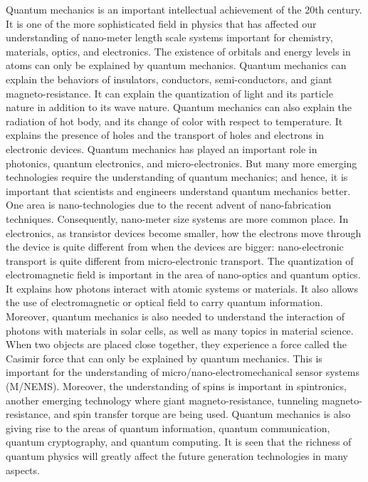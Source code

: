 \documentclass[
  9pt,
]{extbook}
\begin{document}
Quantum mechanics is an important intellectual achievement of the 20th century. It is one of the more sophisticated field in physics that has affected our understanding of nano-meter length scale systems important for chemistry, materials, optics, and electronics. The existence of orbitals and energy levels in atoms can only be explained by quantum mechanics. Quantum mechanics can explain the behaviors of insulators, conductors, semi-conductors, and giant magneto-resistance. It can explain the quantization of light and its particle nature in addition to its wave nature. Quantum mechanics can also explain the radiation of hot body, and its change of color with respect to temperature. It explains the presence of holes and the transport of holes and electrons in electronic devices.
Quantum mechanics has played an important role in photonics, quantum electronics, and micro-electronics. But many more emerging technologies require the understanding of quantum mechanics; and hence, it is important that scientists and engineers understand quantum mechanics better. One area is nano-technologies due to the recent advent of nano-fabrication techniques. Consequently, nano-meter size systems are more common place. In electronics, as transistor devices become smaller, how the electrons move through the device is quite different from when the devices are bigger: nano-electronic transport is quite different from micro-electronic transport.
The quantization of electromagnetic field is important in the area of nano-optics and quantum optics. It explains how photons interact with atomic systems or materials. It also allows the use of electromagnetic or optical field to carry quantum information. Moreover, quantum mechanics is also needed to understand the interaction of photons with materials in solar cells, as well as many topics in material science.
When two objects are placed close together, they experience a force called the Casimir force that can only be explained by quantum mechanics. This is important for the understanding of micro/nano-electromechanical sensor systems (M/NEMS). Moreover, the understanding of spins is important in spintronics, another emerging technology where giant magneto-resistance, tunneling magneto-resistance, and spin transfer torque are being used.
Quantum mechanics is also giving rise to the areas of quantum information, quantum communication, quantum cryptography, and quantum computing. It is seen that the richness
of quantum physics will greatly affect the future generation technologies in many aspects.
\end{document}

